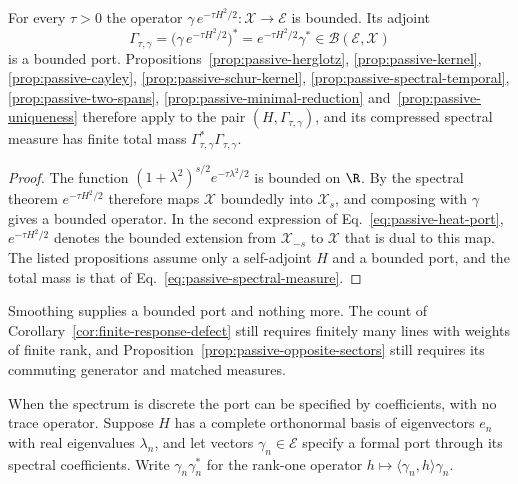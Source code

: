 \begin{proposition}
\label{prop:passive-heat-distributional}
For every $\tau>0$ the operator $\gamma\,e^{-\tau H^2/2}:\mathcal X\to\mathcal E$ is bounded. Its adjoint
\begin{equation}
 \Gamma_{\tau,\gamma}=\bigl(\gamma\,e^{-\tau H^2/2}\bigr)^*=e^{-\tau H^2/2}\gamma^*\in\mathcal B(\mathcal E,\mathcal X)
 \label{eq:passive-heat-port}
\end{equation}
is a bounded port. Propositions~\ref{prop:passive-herglotz}, \ref{prop:passive-kernel}, \ref{prop:passive-cayley}, \ref{prop:passive-schur-kernel}, \ref{prop:passive-spectral-temporal}, \ref{prop:passive-two-spans}, \ref{prop:passive-minimal-reduction} and~\ref{prop:passive-uniqueness} therefore apply to the pair $(H,\Gamma_{\tau,\gamma})$, and its compressed spectral measure has finite total mass $\Gamma_{\tau,\gamma}^*\Gamma_{\tau,\gamma}$.
\end{proposition}
\begin{proof}
The function $(1+\lambda^2)^{s/2}e^{-\tau\lambda^2/2}$ is bounded on $\R$. By the spectral theorem $e^{-\tau H^2/2}$ therefore maps $\mathcal X$ boundedly into $\mathcal X_s$, and composing with $\gamma$ gives a bounded operator. In the second expression of Eq.~\eqref{eq:passive-heat-port}, $e^{-\tau H^2/2}$ denotes the bounded extension from $\mathcal X_{-s}$ to $\mathcal X$ that is dual to this map. The listed propositions assume only a self-adjoint $H$ and a bounded port, and the total mass is that of Eq.~\eqref{eq:passive-spectral-measure}.
\end{proof}

Smoothing supplies a bounded port and nothing more. The count of Corollary~\ref{cor:finite-response-defect} still requires finitely many lines with weights of finite rank, and Proposition~\ref{prop:passive-opposite-sectors} still requires its commuting generator and matched measures.

When the spectrum is discrete the port can be specified by coefficients, with no trace operator. Suppose $H$ has a complete orthonormal basis of eigenvectors $e_n$ with real eigenvalues $\lambda_n$, and let vectors $\gamma_n\in\mathcal E$ specify a formal port through its spectral coefficients. Write $\gamma_n\gamma_n^*$ for the rank-one operator $h\mapsto\langle\gamma_n,h\rangle\gamma_n$.

